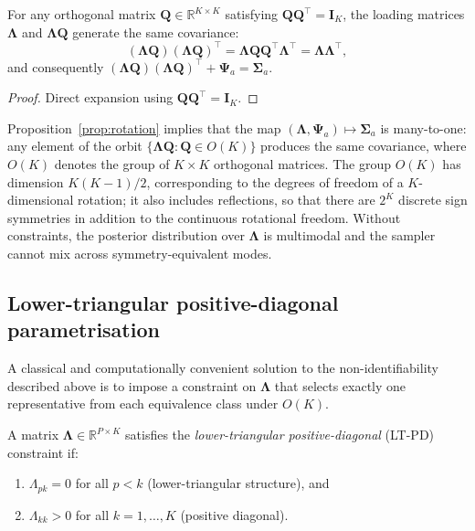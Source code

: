 \begin{proposition}
\label{prop:rotation}
For any orthogonal matrix $\mathbf{Q} \in \mathbb{R}^{K \times K}$ satisfying $\mathbf{Q}\mathbf{Q}^\top = \mathbf{I}_K$, the loading matrices $\boldsymbol{\Lambda}$ and $\boldsymbol{\Lambda}\mathbf{Q}$ generate the same covariance:
\begin{equation}
(\boldsymbol{\Lambda}\mathbf{Q})(\boldsymbol{\Lambda}\mathbf{Q})^\top = \boldsymbol{\Lambda}\mathbf{Q}\mathbf{Q}^\top\boldsymbol{\Lambda}^\top = \boldsymbol{\Lambda}\boldsymbol{\Lambda}^\top,
\label{eq:rotation_equiv}
\end{equation}
and consequently $(\boldsymbol{\Lambda}\mathbf{Q})(\boldsymbol{\Lambda}\mathbf{Q})^\top + \boldsymbol{\Psi}_a = \boldsymbol{\Sigma}_a$.
\end{proposition}
\begin{proof}
Direct expansion using $\mathbf{Q}\mathbf{Q}^\top = \mathbf{I}_K$.
\end{proof}

Proposition~\ref{prop:rotation} implies that the map $(\boldsymbol{\Lambda}, \boldsymbol{\Psi}_a) \mapsto \boldsymbol{\Sigma}_a$ is many-to-one: any element of the orbit $\{\boldsymbol{\Lambda}\mathbf{Q} : \mathbf{Q} \in O(K)\}$ produces the same covariance, where $O(K)$ denotes the group of $K \times K$ orthogonal matrices. The group $O(K)$ has dimension $K(K-1)/2$, corresponding to the degrees of freedom of a $K$-dimensional rotation; it also includes reflections, so that there are $2^K$ discrete sign symmetries in addition to the continuous rotational freedom. Without constraints, the posterior distribution over $\boldsymbol{\Lambda}$ is multimodal and the sampler cannot mix across symmetry-equivalent modes.

\subsection{Lower-triangular positive-diagonal parametrisation}
\label{sec:ltpd}

A classical and computationally convenient solution to the non-identifiability described above is to impose a constraint on $\boldsymbol{\Lambda}$ that selects exactly one representative from each equivalence class under $O(K)$.

\begin{definition}[LT-PD constraint]
\label{def:ltpd}
A matrix $\boldsymbol{\Lambda} \in \mathbb{R}^{P \times K}$ satisfies the \emph{lower-triangular positive-diagonal} (LT-PD) constraint if:
\begin{enumerate}
\item[(i)] $\Lambda_{pk} = 0$ for all $p < k$ \quad (lower-triangular structure), and
\item[(ii)] $\Lambda_{kk} > 0$ for all $k = 1, \ldots, K$ \quad (positive diagonal).
\end{enumerate}
\end{definition}

